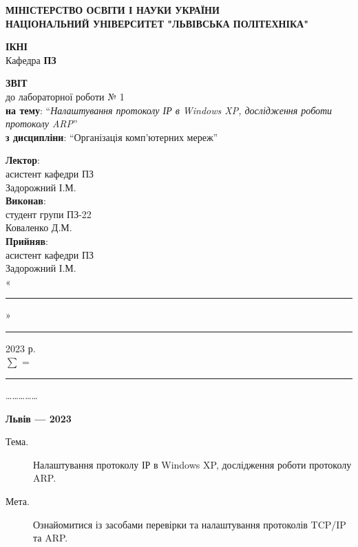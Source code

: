 \documentclass{article}
\newcommand\subject{Організація комп’ютерних мереж}
\newcommand\lecturer{асистент кафедри ПЗ \\ Задорожний І.М.}
\newcommand\teacher{асистент кафедри ПЗ \\ Задорожний І.М.}
\newcommand\mygroup{ПЗ-22}
\newcommand\lab{1}
\newcommand\theme{Налаштування протоколу ІР в Windows XP, дослідження роботи протоколу
	ARP}
\newcommand\purpose{Ознайомитися із засобами перевірки та налаштування протоколів TCP/IP та
	ARP}
\begin{document}
\begin{normalsize}
	\begin{titlepage}
		\thispagestyle{empty}
		\begin{center}
			\textbf{МІНІСТЕРСТВО ОСВІТИ І НАУКИ УКРАЇНИ\\
				НАЦІОНАЛЬНИЙ УНІВЕРСИТЕТ "ЛЬВІВСЬКА ПОЛІТЕХНІКА"}
		\end{center}
		\begin{flushright}
			\textbf{ІКНІ}\\
			Кафедра \textbf{ПЗ}
		\end{flushright}
		\vspace{200pt}
		\begin{center}
			\textbf{ЗВІТ}\\
			\vspace{10pt}
			до лабораторної роботи № \lab\\
			\textbf{на тему}: “\textit{\theme}”\\
			\textbf{з дисципліни}: “\subject”
		\end{center}
		\vspace{112pt}
		\begin{flushright}
			
			\textbf{Лектор}:\\
			\lecturer\\
			\vspace{28pt}
			\textbf{Виконав}:\\
			
			студент групи \mygroup\\
			Коваленко Д.М.\\
			\vspace{28pt}
			\textbf{Прийняв}:\\
			
			\teacher\\
			
			\vspace{28pt}
			«\rule{1cm}{0.15mm}» \rule{1.5cm}{0.15mm} 2023 р.\\
			$\sum$ = \rule{1cm}{0.15mm}……………\\
			
		\end{flushright}
		\vspace{\fill}
		\begin{center}
			\textbf{Львів — 2023}
		\end{center}
	\end{titlepage}
		
	\begin{description}
		\item[Тема.] \theme.
		\item[Мета.] \purpose.
	\end{description}


\end{normalsize}
\end{document}
